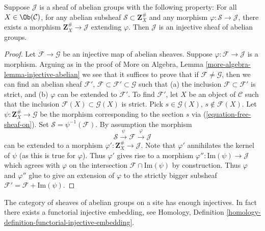\begin{lemma}
\label{lemma-characterize-injectives}
Suppose $\mathcal{J}$ is a sheaf of abelian groups with the following
property: For all $X\in \Ob(\mathcal{C})$, for any abelian subsheaf
$\mathcal{S} \subset \mathbf{Z}_X^\#$ and any morphism
$\varphi : \mathcal{S} \to \mathcal{J}$, there exists a morphism
$\mathbf{Z}_X^\# \to \mathcal{J}$ extending $\varphi$.
Then $\mathcal{J}$ is an injective sheaf of abelian groups.
\end{lemma}

\begin{proof}
Let $\mathcal{F} \to \mathcal{G}$ be an injective map
of abelian sheaves. Suppose $\varphi : \mathcal{F} \to \mathcal{J}$
is a morphism. Arguing as in the proof of
More on Algebra, Lemma \ref{more-algebra-lemma-injective-abelian}
we see that it suffices
to prove that if $\mathcal{F} \not = \mathcal{G}$, then we
can find an abelian sheaf $\mathcal{F}'$,
$\mathcal{F} \subset \mathcal{F}' \subset \mathcal{G}$
such that (a) the inclusion $\mathcal{F} \subset \mathcal{F}'$ is strict,
and (b) $\varphi$ can be extended to $\mathcal{F}'$.
To find $\mathcal{F}'$, let $X$ be an object of $\mathcal{C}$ such
that the inclusion $\mathcal{F}(X) \subset \mathcal{G}(X)$
is strict. Pick $s \in \mathcal{G}(X)$, $s \not \in \mathcal{F}(X)$.
Let $\psi : \mathbf{Z}_X^\# \to \mathcal{G}$ be the morphism corresponding
to the section $s$ via (\ref{equation-free-sheaf-on}). Set
$\mathcal{S} = \psi^{-1}(\mathcal{F})$. By assumption the morphism
$$
\mathcal{S} \xrightarrow{\psi} \mathcal{F} \xrightarrow{\varphi} \mathcal{J}
$$
can be extended to a morphism $\varphi' : \mathbf{Z}_X^\# \to \mathcal{J}$.
Note that $\varphi'$ annihilates the kernel of $\psi$ (as this is true
for $\varphi$). Thus $\varphi'$ gives rise to a morphism
$\varphi'' : \text{Im}(\psi) \to \mathcal{J}$
which agrees with $\varphi$ on the intersection
$\mathcal{F} \cap \text{Im}(\psi)$ by construction.
Thus $\varphi$ and $\varphi''$ glue to give an extension
of $\varphi$ to the strictly bigger subsheaf
$\mathcal{F}' = \mathcal{F} + \text{Im}(\psi)$.
\end{proof}

\begin{theorem}
\label{theorem-sheaves-injectives}
The category of sheaves of abelian groups on a
site has enough injectives. In fact there exists
a functorial injective embedding, see
Homology, Definition \ref{homology-definition-functorial-injective-embedding}.
\end{theorem}


